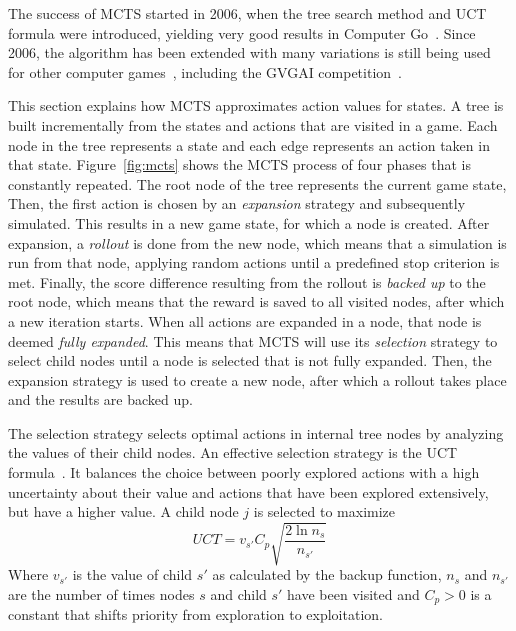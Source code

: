 \label{subsec:mcts}
The success of MCTS started in 2006, when the tree search method and UCT formula
were introduced, yielding very good results in Computer
Go~\cite{gelly2006modification}. Since 2006, the algorithm has been extended
with many variations is still being used for other computer
games~\cite{browne2012survey}, including the GVGAI
competition~\cite{perez2014knowledge}.

This section explains how MCTS approximates action values for states.  A tree is
built incrementally from the states and actions that are visited in a game. Each
node in the tree represents a state and each edge represents an action taken in
that state. Figure~\ref{fig:mcts} shows the MCTS process of four phases that is
constantly repeated. The root node of the tree represents the current game
state, Then, the first action is chosen by an \emph{expansion} strategy and
subsequently simulated. This results in a new game state, for which a node
is created.  After expansion, a \emph{rollout} is done from the new node, which
means that a simulation is run from that node, applying random actions until a
predefined stop criterion is met. Finally, the score difference resulting from
the rollout is \emph{backed up} to the root node, which means that the reward is
saved to all visited nodes, after which a new iteration starts.  When all
actions are expanded in a node, that node is deemed \emph{fully expanded}.  This
means that MCTS will use its \emph{selection} strategy to select child nodes
until a node is selected that is not fully expanded.  Then, the expansion
strategy is used to create a new node, after which a rollout takes place and the
results are backed up.

The selection strategy selects optimal actions in internal tree nodes by
analyzing the values of their child nodes. An effective selection
strategy is the UCT formula~\cite{kocsis2006bandit}. It balances the choice
between poorly explored actions with a high uncertainty about their value and
actions that have been explored extensively, but have a higher value. A child
node $j$ is selected to maximize
\begin{equation}
	\label{eq:uct}
	UCT = v_{s'} C_p \sqrt{\frac{2 \ln n_s}{n_{s'}}}
\end{equation}
Where $v_{s'}$ is the value of child $s'$ as calculated by the backup function,
$n_s$ and $n_{s'}$ are the number of times nodes $s$ and child $s'$ have been
visited and $C_p > 0$ is a constant that shifts priority from exploration to
exploitation.

